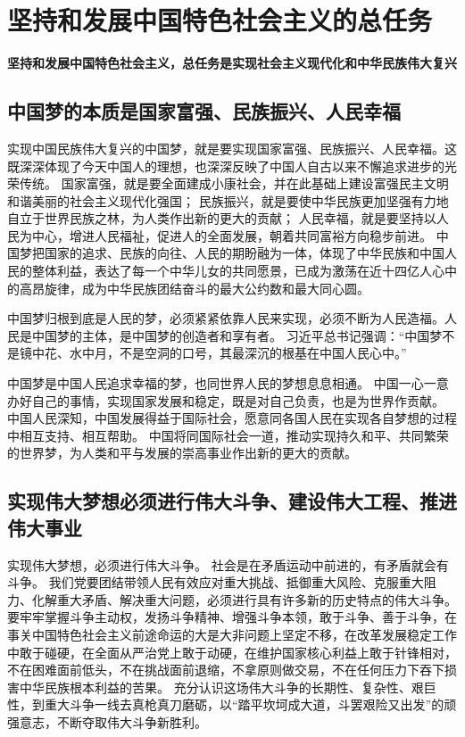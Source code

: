 \documentclass[a4paper, UTF8]{ctexart}
\begin{document}
\section{坚持和发展中国特色社会主义的总任务}
    \textbf{坚持和发展中国特色社会主义，总任务是实现社会主义现代化和中华民族伟大复兴}

    \subsection{中国梦的本质是国家富强、民族振兴、人民幸福}
    实现中国民族伟大复兴的中国梦，就是要实现国家富强、民族振兴、人民幸福。这既深深体现了今天中国人的理想，也深深反映了中国人自古以来不懈追求进步的光荣传统。
    国家富强，就是要全面建成小康社会，并在此基础上建设富强民主文明和谐美丽的社会主义现代化强国；
    民族振兴，就是要使中华民族更加坚强有力地自立于世界民族之林，为人类作出新的更大的贡献；
    人民幸福，就是要坚持以人民为中心，增进人民福祉，促进人的全面发展，朝着共同富裕方向稳步前进。
    中国梦把国家的追求、民族的向往、人民的期盼融为一体，体现了中华民族和中国人民的整体利益，表达了每一个中华儿女的共同愿景，已成为激荡在近十四亿人心中的高昂旋律，成为中华民族团结奋斗的最大公约数和最大同心圆。

    中国梦归根到底是人民的梦，必须紧紧依靠人民来实现，必须不断为人民造福。人民是中国梦的主体，是中国梦的创造者和享有者。
    习近平总书记强调：“中国梦不是镜中花、水中月，不是空洞的口号，其最深沉的根基在中国人民心中。”

    中国梦是中国人民追求幸福的梦，也同世界人民的梦想息息相通。
    中国一心一意办好自己的事情，实现国家发展和稳定，既是对自己负责，也是为世界作贡献。
    中国人民深知，中国发展得益于国际社会，愿意同各国人民在实现各自梦想的过程中相互支持、相互帮助。
    中国将同国际社会一道，推动实现持久和平、共同繁荣的世界梦，为人类和平与发展的崇高事业作出新的更大的贡献。

    \subsection{实现伟大梦想必须进行伟大斗争、建设伟大工程、推进伟大事业}

    实现伟大梦想，必须进行伟大斗争。
    社会是在矛盾运动中前进的，有矛盾就会有斗争。
    我们党要团结带领人民有效应对重大挑战、抵御重大风险、克服重大阻力、化解重大矛盾、解决重大问题，必须进行具有许多新的历史特点的伟大斗争。
    要牢牢掌握斗争主动权，发扬斗争精神、增强斗争本领，敢于斗争、善于斗争，在事关中国特色社会主义前途命运的大是大非问题上坚定不移，在改革发展稳定工作中敢于碰硬，在全面从严治党上敢于动硬，在维护国家核心利益上敢于针锋相对，不在困难面前低头，不在挑战面前退缩，不拿原则做交易，不在任何压力下吞下损害中华民族根本利益的苦果。
    充分认识这场伟大斗争的长期性、复杂性、艰巨性，到重大斗争一线去真枪真刀磨砺，以“踏平坎坷成大道，斗罢艰险又出发”的顽强意志，不断夺取伟大斗争新胜利。
\end{document}
